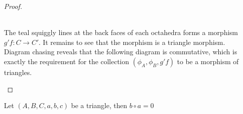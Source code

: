 \begin{proof}
\begin{minipage}[t]{0.48\textwidth}
\begin{center}
            \end{center}
        \end{minipage} \\
        The teal squiggly lines at the back faces of each octahedra forms a morphism $g'f:C\rightarrow C'$. It remains to see that the morphism is a triangle morphism. Diagram chasing reveals that the following diagram is commutative, which is exactly the requirement for the collection $(\phi_A,\phi_B,g'f)$ to be a morphism of triangles.
        \begin{center}
        \end{center}
    \end{proof}

    \begin{lemma}
        Let $(A,B,C,a,b,c)$ be a triangle, then $b\circ a=0$
    \end{lemma}

